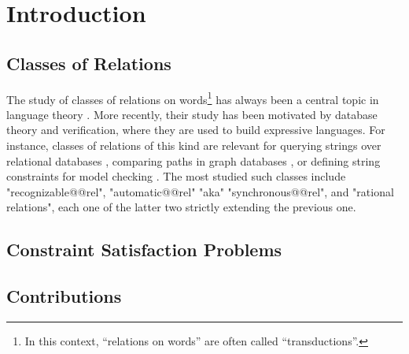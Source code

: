 \section{Introduction}
\AP\label{sec:dichotomy-introduction}


\subsection{Classes of Relations}

The study of classes of relations on words\footnote{In this context, ``relations on words''
are often called ``transductions''.} has always been a central topic in language theory
\cite{ElgotMezi1965RelationsGeneralizedAutomata,Nivat1968TransductionChomsky,Berstel1979Transductions,FrougnySakarovitch1993SynchronizedRationalRelations,Choffrut2006Survey}. 
More recently, their study has been motivated by database theory and verification,
where they are used to build expressive languages. For instance, classes of relations of this kind are relevant for querying strings over relational 
databases \cite{BenediktLibkinSchwentickSegoufin2003DefinableRelations}, comparing paths in graph databases \cite{BarceloLibkinLinWood2012ExpressiveLanguages}, or defining  
string constraints for model checking \cite{LinBarcelo2016StringSolvingWordEquationsTransducers}. 
The most studied such classes include "recognizable@@rel", "automatic@@rel" "aka" "synchronous@@rel", and "rational relations", each one of the latter two strictly extending the previous one. 


\subsection{Constraint Satisfaction Problems}



\subsection{Contributions}



